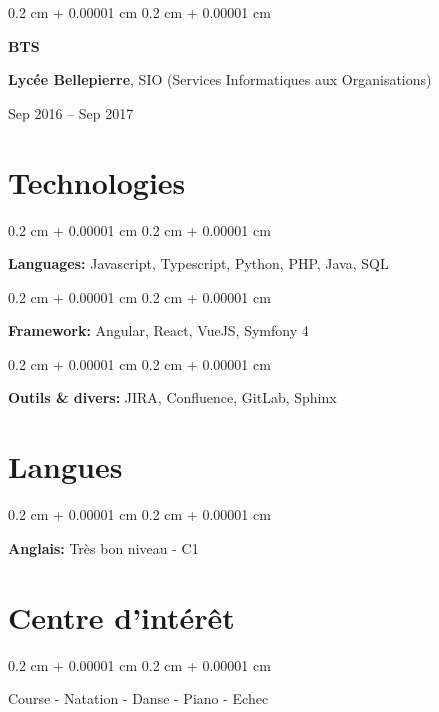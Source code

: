 \documentclass[10pt, letterpaper]{article}
\newenvironment{onecolentry}{
    \begin{adjustwidth}{
        0.2 cm + 0.00001 cm
    }{
        0.2 cm + 0.00001 cm
    }
}{
    \end{adjustwidth}
} %
\newenvironment{threecolentry}[3][]{
    \onecolentry
    \def\thirdColumn{#3}
    \setcolumnwidth{1 cm, \fill, 4.5 cm}
    \begin{paracol}{3}
    {\raggedright #2} \switchcolumn
}{
    \switchcolumn \raggedleft \thirdColumn
    \end{paracol}
    \endonecolentry
} %
\begin{document}
\begin{threecolentry}{\textbf{BTS}}{
		Sep 2016 – Sep 2017
	}
	\textbf{Lycée Bellepierre}, SIO (Services Informatiques aux Organisations)
\end{threecolentry}



\section{Technologies}

        
\begin{onecolentry}
	\textbf{Languages:} Javascript, Typescript, Python, PHP, Java, SQL
\end{onecolentry}

\vspace{0.2 cm}

\begin{onecolentry}
	\textbf{Framework:} Angular, React, VueJS, Symfony 4
\end{onecolentry}

\vspace{0.2 cm}

\begin{onecolentry}
	\textbf{Outils \& divers:} JIRA, Confluence, GitLab, Sphinx
\end{onecolentry}


\section{Langues}

        
\begin{onecolentry}
	\textbf{Anglais:} Très bon niveau - C1
\end{onecolentry}



\section{Centre d'intérêt}

        
\begin{onecolentry}
	\textbf{} Course - Natation - Danse - Piano - Echec
    
\end{onecolentry}

\vspace{0.2 cm}
\end{document}
